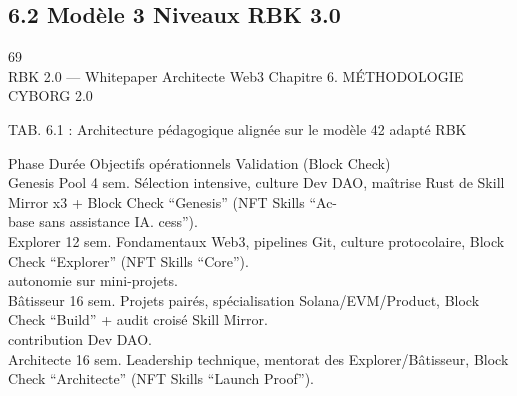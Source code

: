 \subsection{6.2 Modèle 3 Niveaux RBK 3.0}
\vspace{0.5em}
\vspace{0.5em}
\vspace{0.5em}
\vspace{0.5em}
69\\
RBK 2.0 — Whitepaper Architecte Web3                                                                   Chapitre 6. MÉTHODOLOGIE CYBORG 2.0\\
\vspace{0.5em}
\vspace{0.5em}
\vspace{0.5em}
\vspace{0.5em}
\begin{center}\begin{tabular}TAB. 6.1 : Architecture pédagogique alignée sur le modèle 42 adapté RBK\end{tabular}\end{center}
\vspace{0.5em}
\vspace{0.5em}
Phase                Durée     Objectifs opérationnels                                   Validation (Block Check)\\
Genesis Pool         4 sem.    Sélection intensive, culture Dev DAO, maîtrise Rust de    Skill Mirror x3 + Block Check “Genesis” (NFT Skills “Ac-\\
base sans assistance IA.                                  cess”).\\
Explorer             12 sem.   Fondamentaux Web3, pipelines Git, culture protocolaire,   Block Check “Explorer” (NFT Skills “Core”).\\
autonomie sur mini-projets.\\
Bâtisseur            16 sem.   Projets pairés, spécialisation Solana/EVM/Product,        Block Check “Build” + audit croisé Skill Mirror.\\
contribution Dev DAO.\\
Architecte           16 sem.   Leadership technique, mentorat des Explorer/Bâtisseur,    Block Check “Architecte” (NFT Skills “Launch Proof”).\\
\vspace{0.5em}
\vspace{0.5em}
\vspace{0.5em}
\vspace{0.5em}
